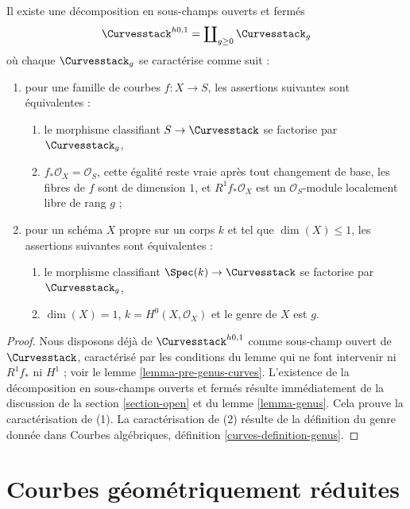 \begin{lemma}
\label{lemma-pre-genus-one-piece-per-genus}
Il existe une décomposition en sous-champs ouverts et fermés
$$
\Curvesstack^{h0, 1} = \coprod\nolimits_{g \geq 0} \Curvesstack_g
$$
où chaque $\Curvesstack_g$ se caractérise comme suit :
\begin{enumerate}
\item pour une famille de courbes $f : X \to S$, les assertions suivantes
sont équivalentes :
\begin{enumerate}
\item le morphisme classifiant $S \to \Curvesstack$ se factorise par
$\Curvesstack_g$,
\item $f_*\mathcal{O}_X = \mathcal{O}_S$, cette égalité reste vraie après
tout changement de base, les fibres de $f$ sont de dimension $1$, et
$R^1f_*\mathcal{O}_X$ est un $\mathcal{O}_S$-module localement libre de rang $g$ ;
\end{enumerate}
\item pour un schéma $X$ propre sur un corps $k$ et tel que $\dim(X) \leq 1$,
les assertions suivantes sont équivalentes :
\begin{enumerate}
\item le morphisme classifiant $\Spec(k) \to \Curvesstack$ se factorise par
$\Curvesstack_g$,
\item $\dim(X) = 1$, $k = H^0(X, \mathcal{O}_X)$ et
le genre de $X$ est $g$.
\end{enumerate}
\end{enumerate}
\end{lemma}

\begin{proof}
Nous disposons déjà de $\Curvesstack^{h0, 1}$ comme sous-champ ouvert de
$\Curvesstack$, caractérisé par les conditions du lemme qui ne font intervenir
ni $R^1f_*$ ni $H^1$ ; voir le lemme \ref{lemma-pre-genus-curves}.
L'existence de la décomposition en sous-champs ouverts et fermés
résulte immédiatement de la discussion de la section \ref{section-open}
et du lemme \ref{lemma-genus}. Cela prouve la caractérisation de (1).
La caractérisation de (2) résulte de la définition du
genre donnée dans Courbes algébriques, définition \ref{curves-definition-genus}.
\end{proof}









\section{Courbes géométriquement réduites}
\label{section-geometrically-reduced}

